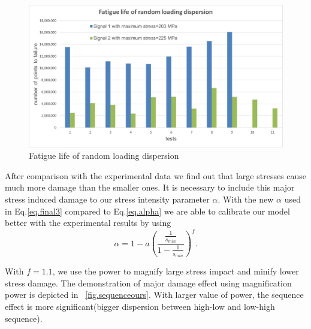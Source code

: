 \documentclass[3p,times,procedia,number]{elsarticle}
\newcommand{\figref}[1]{\figurename~\ref{#1}}
\begin{document}
\begin{figure}[!h]
	\centering
	\includegraphics[width=\textwidth]{figures//randomdispersion.png} 
	\caption{Fatigue life of random loading dispersion}
	\label{fig.randomdispersion}
\end{figure}

After comparison with the experimental data we find out that large stresses cause much more damage than the smaller ones. It is necessary to include this major stress induced damage to our stress intensity parameter $\alpha$. With the new $\alpha$ used in Eq.\eqref{eq.final3} compared to Eq.\eqref{eq.alpha} we are able to calibrate our model better with the experimental results by using 
\begin{equation}
\alpha=1-a\left(  \dfrac{\frac{1}{s_{min}}}{1-\frac{1}{s_{min}}} \right) ^{f}.
\label{eq.majoralp}
\end{equation}


With $f=1.1$, we use the power to magnify large stress impact and minify lower stress damage.  The demonstration of major damage effect using magnification power is depicted in \figref{fig.sequenceours}. With larger value of power, the sequence effect is more significant(bigger dispersion between high-low and low-high sequence).
\end{document}
